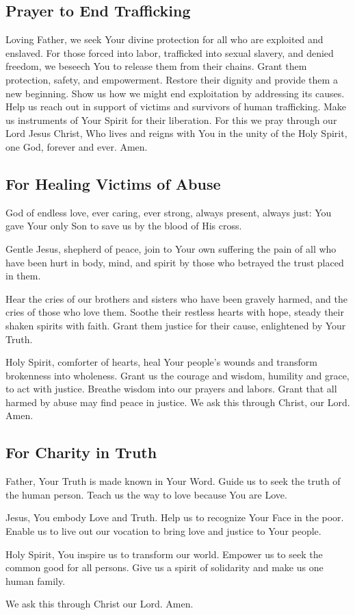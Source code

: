 \documentclass[12pt]{article}
\newcommand{\prayertitle}[1]{\subsection{#1}}
\begin{document}
\prayertitle{Prayer to End Trafficking}
\label{prayer:trafficking}
Loving Father, we seek Your divine protection for all who are exploited and enslaved.
For those forced into labor, trafficked into sexual slavery, and denied freedom,
we beseech You to release them from their chains.
Grant them protection, safety, and empowerment.
Restore their dignity and provide them a new beginning.
Show us how we might end exploitation by addressing its causes.
Help us reach out in support of victims and survivors of human trafficking.
Make us instruments of Your Spirit for their liberation.
For this we pray through our Lord Jesus Christ, Who lives and reigns with You in the unity of the Holy Spirit, one God, forever and ever.
Amen.

\prayertitle{For Healing Victims of Abuse}
\label{prayer:healing_victims_abuse}
God of endless love, ever caring, ever strong, always present, always just:
You gave Your only Son to save us by the blood of His cross.

Gentle Jesus, shepherd of peace, join to Your own suffering the pain of all who have been hurt in body, mind, and spirit by those who betrayed the trust placed in them.

Hear the cries of our brothers and sisters who have been gravely harmed, and the cries of those who love them.
Soothe their restless hearts with hope, steady their shaken spirits with faith.
Grant them justice for their cause, enlightened by Your Truth.

Holy Spirit, comforter of hearts, heal Your people's wounds and transform brokenness into wholeness.
Grant us the courage and wisdom, humility and grace, to act with justice.
Breathe wisdom into our prayers and labors.
Grant that all harmed by abuse may find peace in justice.
We ask this through Christ, our Lord. Amen.

\prayertitle{For Charity in Truth}
\label{prayer:charity_truth}
Father, Your Truth is made known in Your Word.
Guide us to seek the truth of the human person.
Teach us the way to love because You are Love.

Jesus, You embody Love and Truth.
Help us to recognize Your Face in the poor.
Enable us to live out our vocation to bring love and justice to Your people.

Holy Spirit, You inspire us to transform our world.
Empower us to seek the common good for all persons.
Give us a spirit of solidarity and make us one human family.

We ask this through Christ our Lord. Amen.
\end{document}
